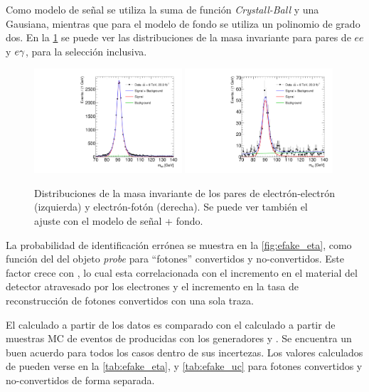 Como modelo de señal se utiliza la suma de función \emph{Crystall-Ball} y una
Gausiana, mientras que para el modelo de fondo se utiliza un polinomio de grado
dos. En la \cref{fig:invmass_pairs} se puede ver las distribuciones de la masa
invariante para pares de $ee$ y $e\gamma$, para la selección inclusiva.

\begin{figure}[!htbp]
  \centering

  \includegraphics[width=0.49\textwidth]{figures/Fit_mee_efakes_Data_all}
  \includegraphics[width=0.49\textwidth]{figures/Fit_meg_efakes_Data_all}
  \caption{Distribuciones de la masa invariante de los pares de
    electrón-electrón (izquierda) y electrón-fotón (derecha). Se puede ver también el ajuste
    con el modelo de señal + fondo.}
  \label{fig:invmass_pairs}

\end{figure}

La probabilidad de identificación errónea se muestra en la \cref{fig:efake_eta},
como función del {\abseta} del objeto \emph{probe} para ``fotones'' convertidos
y no-convertidos. Este factor crece con {\abseta}, lo cual esta correlacionada
con el incremento en el material del detector atravesado por los electrones y el
incremento en la tasa de reconstrucción de fotones convertidos con una sola
traza.

El {\feg} calculado a partir de los datos es comparado con el calculado a partir
de muestras MC de eventos de {\Zee} producidas con los generadores {\sherpa} y
{\powheg}. Se encuentra un buen acuerdo para todos los casos dentro de sus incertezas.
Los valores calculados de {\feg} pueden verse en la \cref{tab:efake_eta}, y \cref{tab:efake_uc} para fotones
convertidos y no-convertidos de forma separada.

